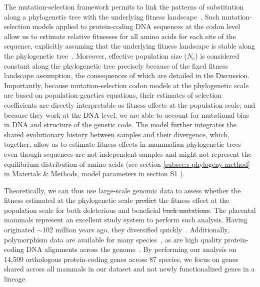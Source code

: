 \documentclass{article}
\newcommand{\Ne}{N_{\text{e}}}
\providecommand{\DIFaddtex}[1]{{\protect\color{blue}\uwave{#1}}} %
\providecommand{\DIFdeltex}[1]{{\protect\color{red}\sout{#1}}}                      %
\providecommand{\DIFaddbegin}{} %
\providecommand{\DIFaddend}{} %
\providecommand{\DIFdelbegin}{} %
\providecommand{\DIFdelend}{} %
\providecommand{\DIFadd}[1]{\texorpdfstring{\DIFaddtex{#1}}{#1}} %
\providecommand{\DIFdel}[1]{\texorpdfstring{\DIFdeltex{#1}}{}} %
\newcommand{\DIFscaledelfig}{0.5}
\newlength{\DIFdelgraphicswidth} %
\newlength{\DIFdelgraphicsheight} %
\newcommand{\DIFaddincludegraphics}[2][]{{\color{blue}\fbox{\DIFOincludegraphics[#1]{#2}}}} %
\newcommand{\DIFdelincludegraphics}[2][]{%
\sbox{\DIFdelgraphicsbox}{\DIFOincludegraphics[#1]{#2}}%
\settoboxwidth{\DIFdelgraphicswidth}{\DIFdelgraphicsbox} %
\settoboxtotalheight{\DIFdelgraphicsheight}{\DIFdelgraphicsbox} %
\scalebox{\DIFscaledelfig}{%
\parbox[b]{\DIFdelgraphicswidth}{\usebox{\DIFdelgraphicsbox}\\[-\baselineskip] \rule{\DIFdelgraphicswidth}{0em}}\llap{\resizebox{\DIFdelgraphicswidth}{\DIFdelgraphicsheight}{%
\setlength{\unitlength}{\DIFdelgraphicswidth}%
\begin{picture}(1,1)%
\thicklines\linethickness{2pt} %
{\color[rgb]{1,0,0}\put(0,0){\framebox(1,1){}}}%
{\color[rgb]{1,0,0}\put(0,0){\line( 1,1){1}}}%
{\color[rgb]{1,0,0}\put(0,1){\line(1,-1){1}}}%
\end{picture}%
}\hspace*{3pt}}} %
} %
\DeclareRobustCommand{\DIFaddbegin}{\DIFOaddbegin \let\includegraphics\DIFaddincludegraphics} %
\DeclareRobustCommand{\DIFaddend}{\DIFOaddend \let\includegraphics\DIFOincludegraphics} %
\DeclareRobustCommand{\DIFdelbegin}{\DIFOdelbegin \let\includegraphics\DIFdelincludegraphics} %
\DeclareRobustCommand{\DIFdelend}{\DIFOaddend \let\includegraphics\DIFOincludegraphics} %
\begin{document}
    The mutation-selection framework permits to link the patterns of substitution along a phylogenetic tree with the underlying fitness landscape~\cite{halpern_evolutionary_1998, mccandlish_modeling_2014}.
    Such mutation-selection models applied to protein-coding DNA sequences at the codon level allow us to estimate relative fitnesses for all amino acids for each site of the sequence, explicitly assuming that the underlying fitness landscape is stable along the phylogenetic tree~\cite{rodrigue_mechanistic_2010, tamuri_estimating_2012, rodrigue_detecting_2017}.
    Moreover, effective population size ($\Ne$) is considered constant along the phylogenetic tree precisely because of the fixed fitness landscape assumption, the consequences of which are detailed in the Discussion.
    Importantly, because mutation-selection codon models at the phylogenetic scale are based on population-genetics equations, their estimates of selection coefficients are directly interpretable as fitness effects at the population scale; and because they work at the DNA level, we are able to account for mutational bias in DNA and structure of the genetic code.
    The model further integrates the shared evolutionary history between samples and their divergence, which, together, allow us to estimate fitness effects in mammalian phylogenetic trees even though sequences are not independent samples and might not represent the equilibrium distribution of amino acids (see section \ref{subsec:s-phylogeny-method} in Materials \& Methods, model parameters in section S1 \DIFaddbegin \DIFadd{and fig.~S1}\DIFaddend ).

    Theoretically, we can thus use large-scale genomic data to assess whether the fitness estimated at the phylogenetic scale \DIFdelbegin \DIFdel{predict }\DIFdelend \DIFaddbegin \DIFadd{predicts }\DIFaddend the fitness effect at the population scale for both deleterious and beneficial \DIFdelbegin \DIFdel{back-mutations}\DIFdelend \DIFaddbegin \DIFadd{non-adaptive mutations}\DIFaddend .
    The placental mammals represent an excellent study system to perform such analysis.
    Having originated $\sim$102 million years ago, they diversified quickly~\cite{foley_genomic_2023}.
    Additionally, polymorphism data are available for many species~\cite{howe_ensembl_2021}, as are high quality protein-coding DNA alignments across the genome~\cite{ranwez_orthomam_2007, scornavacca_orthomam_2019}.
    By performing our analysis on 14,509 orthologous protein-coding genes across 87 species, we focus on genes shared across all mammals in our dataset and not newly functionalized genes in a lineage.
\end{document}
